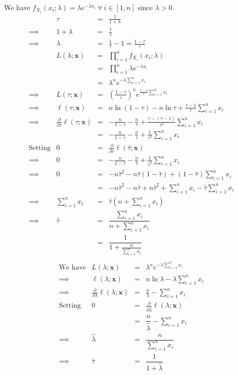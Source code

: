 \documentclass[11pt,a4paper]{article}
\begin{document}
\apart
We have $f_{X_i}(x_i;\lambda)=\lambda e^{-\lambda x_i}\ \forall\ i\in[1,n]$ since $\lambda>0$.
\[\begin{array}{rrcl}
&\tau&=&\frac{1}{1+\lambda}\\
\implies&1+\lambda&=&\frac{1}{\tau}\\
\implies&\lambda&=&\frac{1}{\tau}-1=\frac{1-\tau}{\tau}\\
&L(\lambda;\textbf{x})&=&\prod\limits_{i=1}^nf_{X_i}(x_i;\lambda)\\
&&=&\prod\limits_{i=1}^n\lambda e^{-\lambda x_i}\\
&&=&\lambda^ne^{-\lambda\sum_{i=1}^nx_i}\\
\implies&L(\tau;\textbf{x})&=&\left(\frac{1-\tau}{\tau}\right)^ne^{\frac{\tau-1}{\tau}\sum_{i=1}^nx_i}\\
\implies&\ell(\tau;\textbf{x})&=&n\ln(1-\tau)-n\ln\tau+\frac{\tau-1}{\tau}\sum\limits_{i=1}^nx_i\\
\implies&\frac{\partial}{\partial\tau}\ell(\tau;\textbf{x})&=&-\frac{n}{1-\tau}-\frac{n}{\tau}+\frac{\tau-(\tau-1)}{\tau^2}\sum\limits_{i=1}^nx_i\\
&&=&-\frac{n}{1-\tau}-\frac{n}{\tau}+\frac{1}{\tau^2}\sum\limits_{i=1}^nx_i\\
\text{Setting}&0&=&\frac{\partial}{\partial\tau}\ell(\hat{\tau};\textbf{x})\\
\implies&0&=&-\frac{n}{1-\hat{\tau}}-\frac{n}{\hat{\tau}}+\frac{1}{\hat{\tau}^2}\sum\limits_{i=1}^nx_i\\
\implies&0&=&-n\hat{\tau}^2-n\hat{\tau}(1-\hat{\tau})+(1-\hat{\tau})\sum\limits_{i=1}^nx_i\\
&&=&-n\hat{\tau}^2-n\hat{\tau}+n\hat{\tau}^2+\sum\limits_{i=1}^nx_i-\hat{\tau}\sum\limits_{i=1}^nx_i\\
\implies&\sum\limits_{i=1}^nx_i&=&\hat{\tau}\left(n+\sum\limits_{i=1}^nx_i\right)\\
\implies&\hat{\tau}&=&\dfrac{\sum_{i=1}^nx_i}{n+\sum_{i=1}^nx_i}\\
&&=&\dfrac{1}{1+\frac{n}{\sum_{i=1}^nx_i}}\\
\end{array}\]
\[\begin{array}{rrcl}
\text{We have}&L(\lambda;\textbf{x})&=&\lambda^ne^{-\lambda\sum_{i=1}^nx_i}\\
\implies&\ell(\lambda;\textbf{x})&=&n\ln\lambda-\lambda\sum\limits_{i=1}^nx_i\\
\implies&\frac{\partial}{\partial\lambda}\ell(\lambda;\textbf{x})&=&\frac{n}{\lambda}-\sum\limits_{i=1}^nx_i\\
\text{Setting}&0&=&\frac{\partial}{\partial\hat{\lambda}}\ell(\lambda;\textbf{x})\\
&&=&\dfrac{n}{\hat{\lambda}}-\sum\limits_{i=1}^nx_i\\
\implies&\hat{\lambda}&=&\dfrac{n}{\sum_{i=1}^nx_i}\\
\implies&\hat{\tau}&=&\dfrac{1}{1+\hat{\lambda}}
\end{array}\]
\end{document}
